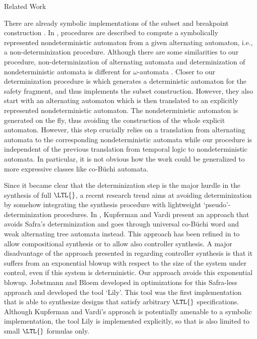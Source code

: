 \documentclass[copyright,creativecommons]{eptcs}
\begin{document}
\begin{section}{Related Work}

\label{RelatedWork}
There are already symbolic implementations of the subset and breakpoint construction \cite{AEFK05,BCPR06}. In \cite{BCPR06}, procedures are described to compute a symbolically represented nondeterministic automaton from a given alternating automaton, i.e., a non-determinization procedure. Although there are some similarities to our procedure, non-determinization of alternating automata and determinization of nondeterministic automata is different for $\omega$-automata \cite{TuSc05a}. Closer to our determinization procedure is \cite{AEFK05} which generates a deterministic automaton for the safety fragment, and thus implements the subset construction. However, they also start with an alternating automaton which is then translated to an explicitly represented nondeterministic automaton. The nondeterministic automaton is generated on the fly, thus avoiding the construction of the whole explicit automaton. However, this step crucially relies on a translation from alternating automata to the corresponding nondeterministic automata while our procedure is independent of the previous translation from temporal logic to nondeterministic automata. In particular, it is not obvious how the work \cite{AEFK05} could be generalized to more expressive classes like co-Büchi automata.

Since it became clear that the determinization step is the major hurdle in the synthesis of full $\LTL{}$, a recent research trend aims at avoiding determinization by somehow integrating the synthesis procedure with lightweight `pseudo'-determinization procedures. In \cite{KuVa05a}, Kupferman and Vardi present an approach that avoids Safra's determinization and goes through universal co-Büchi word and weak alternating tree automata instead. This approach has been refined in \cite{KuPV06} to allow compositional synthesis or to allow also controller synthesis. A major disadvantage of the approach presented in \cite{KuVa05a} regarding controller synthesis is that it suffers from an exponential blowup with respect to the size of the system under control, even if this system is deterministic. Our approach avoids this exponential blowup. Jobstmann and Bloem developed in \cite{JoBl06} optimizations for this Safra-less approach and developed the tool `Lily'. This tool was the first implementation that is able to synthesize designs that satisfy arbitrary $\LTL{}$ specifications. Although Kupferman and Vardi's approach is potentially amenable to a symbolic implementation, the tool Lily is implemented explicitly, so that is also limited to small $\LTL{}$ formulas only.


\end{section}
\end{document}
